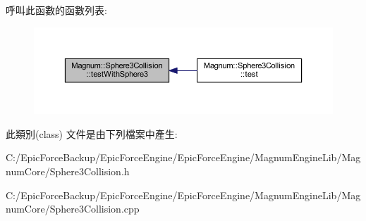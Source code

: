 呼叫此函數的函數列表\+:\nopagebreak
\begin{figure}[H]
\begin{center}
\leavevmode
\includegraphics[width=350pt]{class_magnum_1_1_sphere3_collision_a7d3bd58c5d443ca38cfc060057298be6_icgraph}
\end{center}
\end{figure}




此類別(class) 文件是由下列檔案中產生\+:\begin{DoxyCompactItemize}
\item 
C\+:/\+Epic\+Force\+Backup/\+Epic\+Force\+Engine/\+Epic\+Force\+Engine/\+Magnum\+Engine\+Lib/\+Magnum\+Core/Sphere3\+Collision.\+h\item 
C\+:/\+Epic\+Force\+Backup/\+Epic\+Force\+Engine/\+Epic\+Force\+Engine/\+Magnum\+Engine\+Lib/\+Magnum\+Core/Sphere3\+Collision.\+cpp\end{DoxyCompactItemize}

